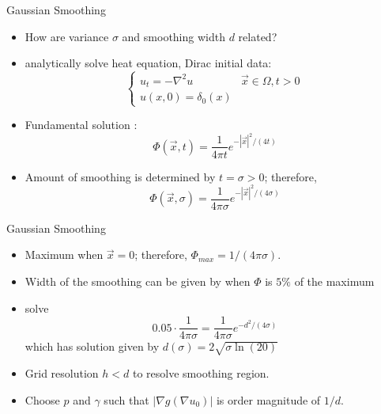 \documentclass[xcolor=dvipsnames]{beamer}
\begin{document}
\begin{frame}{Gaussian Smoothing}
    \begin{itemize}
        \item How are variance $\sigma$ and smoothing width $d$ related?
        \item analytically solve heat equation, Dirac initial data:
\[
\begin{cases}
u_t = -\nabla^2u & \vec{x}\in\Omega, t>0\\
u(x,0)= \delta_0(x)
\end{cases}
\]
\item Fundamental solution \cite{evans2010partial}:
\[
\Phi(\vec{x},t)=\frac{1}{4\pi t}e^{-|\vec{x}|^2/(4t)}
\]
 \item Amount of smoothing is determined by $t=\sigma>0$; therefore,
\[
\Phi(\vec{x},\sigma)=\frac{1}{4\pi \sigma}e^{-|\vec{x}|^2/(4\sigma)}
\]
    \end{itemize}
\end{frame}
\begin{frame}{Gaussian Smoothing}
\begin{itemize}
    \item Maximum when $\vec{x}=0$; therefore, $\Phi_{max}=1/(4\pi \sigma)$. \vspace{2mm}
    \item Width of the smoothing can be given by when $\Phi$ is $5\%$ of the maximum\vspace{2mm}
    \item solve
\[
0.05\cdot\frac{1}{4\pi\sigma}=\frac{1}{4\pi \sigma}e^{-d^2/(4\sigma)}
\]
which has solution given by $d(\sigma) = 2\sqrt{\sigma\ln(20)}$\vspace{2mm}
\item Grid resolution $h<d$ to resolve smoothing region.\vspace{2mm}
\item Choose $p$ and $\gamma$ such that $|\nabla g(\nabla u_0)|$ is order magnitude of $1/d$.
\end{itemize}
\end{frame}
\end{document}
